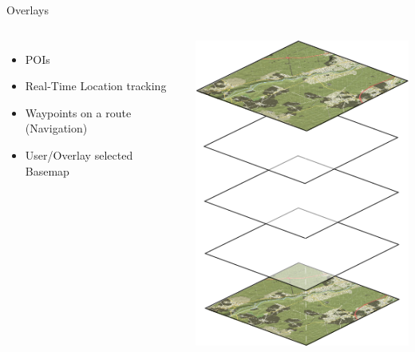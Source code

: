 \documentclass{beamer}
\begin{document}
\begin{frame}{Overlays}
 \begin{columns}
   \begin{itemize}
    \item POIs
    \item Real-Time Location tracking
    \item Waypoints on a route (Navigation)
    \item User/Overlay selected Basemap
   \end{itemize}
   \includegraphics[scale=0.5]{images/overlay_layers}
 \end{columns}
\end{frame}
\end{document}
